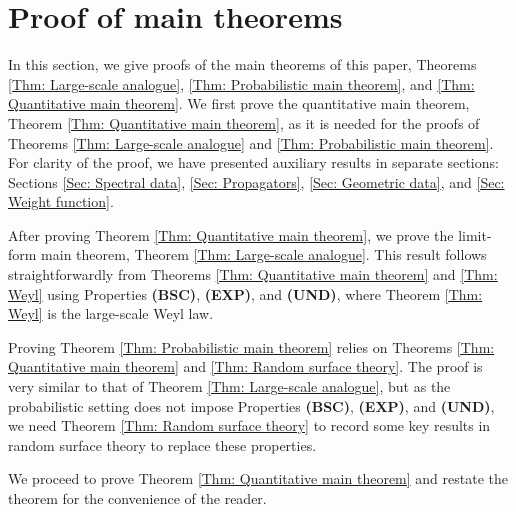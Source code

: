 \documentclass[11pt,twoside,reqno]{amsart} \usepackage{a4wide} \usepackage[T1]{fontenc} \usepackage[utf8]{inputenc} \usepackage{soul}  \usepackage{amsmath} \usepackage{amsfonts} \usepackage{amssymb} \usepackage{mathtools} \usepackage{amsthm} \usepackage{xcolor} \usepackage{graphicx} \usepackage{hyperref} \usepackage{standalone} \usepackage{esint} \usepackage{comment} \usepackage[left=2.3cm,top=3cm,right=2.3cm]{geometry} \usepackage{bm} \usepackage{svg} \usepackage{float} \numberwithin{equation}{section} \theoremstyle{plain} \newtheorem{thm}{Theorem}[section] \newtheorem{theorem}[thm]{Theorem} \newtheorem*{theorem*}{Theorem}\newtheorem{conj}[thm]{Conjecture} \newtheorem{lemma}[thm]{Lemma} \newtheorem{prop}[thm]{Proposition} \newtheorem{proposition}[thm]{Proposition} \newtheorem{cor}[thm]{Corollary} \newtheorem{question}[thm]{Question} \newtheorem{corollary}[thm]{Corollary} \newtheorem{assumption}[thm]{Assumption} \theoremstyle{definition} \newtheorem{defn}[thm]{Definition} \newtheorem{choice}[thm]{Choice} \newtheorem{definition}[thm]{Definition} \newtheorem{ex}[thm]{Example} \newtheorem{notation}[thm]{Notation} \newtheorem*{ack}{Acknowledgements} \theoremstyle{remark} \newtheorem{remark}[thm]{Remark} \newtheorem{bigremark}[thm]{Remark} \usepackage{xcolor} \newcommand{\red}[1]{ {\color{Red}#1} } \newcommand{\blue}[1]{ {\color{Blue}#1} } \author{Kai Hippi} \address{Aalto University, Espoo, Finland} \email{kai.hippi@aalto.fi}
\begin{document}


\section{Proof of main theorems}\label{Sec: Main theorems}

In this section, we give proofs of the main theorems of this paper, Theorems \ref{Thm: Large-scale analogue}, \ref{Thm: Probabilistic main theorem}, and \ref{Thm: Quantitative main theorem}. We first prove the quantitative main theorem, Theorem \ref{Thm: Quantitative main theorem}, as it is needed for the proofs of Theorems \ref{Thm: Large-scale analogue} and \ref{Thm: Probabilistic main theorem}. For clarity of the proof, we have presented auxiliary results in separate sections: Sections \ref{Sec: Spectral data}, \ref{Sec: Propagators}, \ref{Sec: Geometric data}, and \ref{Sec: Weight function}.

After proving Theorem \ref{Thm: Quantitative main theorem}, we prove the limit-form main theorem, Theorem \ref{Thm: Large-scale analogue}. This result follows straightforwardly from Theorems \ref{Thm: Quantitative main theorem} and \ref{Thm: Weyl} using Properties \textbf{(BSC)}, \textbf{(EXP)}, and \textbf{(UND)}, where Theorem \ref{Thm: Weyl} is the large-scale Weyl law.

Proving Theorem \ref{Thm: Probabilistic main theorem} relies on Theorems \ref{Thm: Quantitative main theorem} and \ref{Thm: Random surface theory}. The proof is very similar to that of Theorem \ref{Thm: Large-scale analogue}, but as the probabilistic setting does not impose Properties \textbf{(BSC)}, \textbf{(EXP)}, and \textbf{(UND)}, we need Theorem \ref{Thm: Random surface theory} to record some key results in random surface theory to replace these properties. 

We proceed to prove Theorem \ref{Thm: Quantitative main theorem} and restate the theorem for the convenience of the reader.
\end{document}
